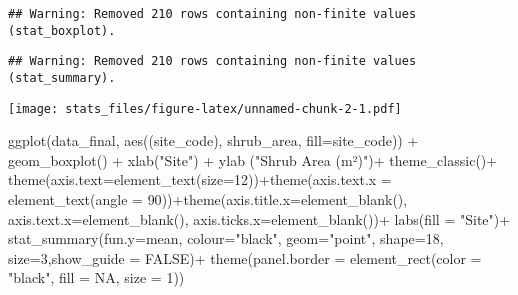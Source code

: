 \documentclass[
]{article}
\newenvironment{Shaded}{\begin{snugshade}}{\end{snugshade}}
\newcommand{\AttributeTok}[1]{\textcolor[rgb]{0.77,0.63,0.00}{#1}}
\newcommand{\ConstantTok}[1]{\textcolor[rgb]{0.00,0.00,0.00}{#1}}
\newcommand{\DecValTok}[1]{\textcolor[rgb]{0.00,0.00,0.81}{#1}}
\newcommand{\FunctionTok}[1]{\textcolor[rgb]{0.00,0.00,0.00}{#1}}
\newcommand{\NormalTok}[1]{#1}
\newcommand{\SpecialCharTok}[1]{\textcolor[rgb]{0.00,0.00,0.00}{#1}}
\newcommand{\StringTok}[1]{\textcolor[rgb]{0.31,0.60,0.02}{#1}}
\begin{document}
\begin{verbatim}
## Warning: Removed 210 rows containing non-finite values (stat_boxplot).
\end{verbatim}

\begin{verbatim}
## Warning: Removed 210 rows containing non-finite values (stat_summary).
\end{verbatim}

\texttt{[image: stats\_files/figure-latex/unnamed-chunk-2-1.pdf]}

\begin{Shaded}
\begin{Highlighting}[]
\FunctionTok{ggplot}\NormalTok{(data\_final, }\FunctionTok{aes}\NormalTok{((site\_code), shrub\_area, }\AttributeTok{fill=}\NormalTok{site\_code)) }\SpecialCharTok{+} \FunctionTok{geom\_boxplot}\NormalTok{() }\SpecialCharTok{+} \FunctionTok{xlab}\NormalTok{(}\StringTok{"Site"}\NormalTok{) }\SpecialCharTok{+} \FunctionTok{ylab}\NormalTok{ (}\StringTok{"Shrub Area (m²)"}\NormalTok{)}\SpecialCharTok{+} \FunctionTok{theme\_classic}\NormalTok{()}\SpecialCharTok{+} \FunctionTok{theme}\NormalTok{(}\AttributeTok{axis.text=}\FunctionTok{element\_text}\NormalTok{(}\AttributeTok{size=}\DecValTok{12}\NormalTok{))}\SpecialCharTok{+}\FunctionTok{theme}\NormalTok{(}\AttributeTok{axis.text.x =} \FunctionTok{element\_text}\NormalTok{(}\AttributeTok{angle =} \DecValTok{90}\NormalTok{))}\SpecialCharTok{+}\FunctionTok{theme}\NormalTok{(}\AttributeTok{axis.title.x=}\FunctionTok{element\_blank}\NormalTok{(),}
        \AttributeTok{axis.text.x=}\FunctionTok{element\_blank}\NormalTok{(),}
        \AttributeTok{axis.ticks.x=}\FunctionTok{element\_blank}\NormalTok{())}\SpecialCharTok{+} \FunctionTok{labs}\NormalTok{(}\AttributeTok{fill =} \StringTok{"Site"}\NormalTok{)}\SpecialCharTok{+} \FunctionTok{stat\_summary}\NormalTok{(}\AttributeTok{fun.y=}\NormalTok{mean, }\AttributeTok{colour=}\StringTok{"black"}\NormalTok{, }\AttributeTok{geom=}\StringTok{"point"}\NormalTok{, }\AttributeTok{shape=}\DecValTok{18}\NormalTok{, }\AttributeTok{size=}\DecValTok{3}\NormalTok{,}\AttributeTok{show\_guide =} \ConstantTok{FALSE}\NormalTok{)}\SpecialCharTok{+} \FunctionTok{theme}\NormalTok{(}\AttributeTok{panel.border =} \FunctionTok{element\_rect}\NormalTok{(}\AttributeTok{color =} \StringTok{"black"}\NormalTok{,}
                                    \AttributeTok{fill =} \ConstantTok{NA}\NormalTok{,}
                                    \AttributeTok{size =} \DecValTok{1}\NormalTok{))}
\end{Highlighting}
\end{Shaded}
\end{document}
